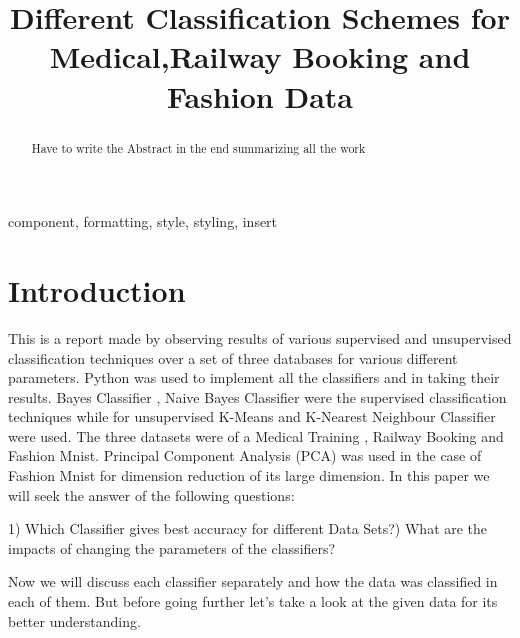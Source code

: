 \documentclass[conference]{IEEEtran}
\begin{document}
\title{Different Classification Schemes for Medical,Railway Booking and Fashion Data\\}

\author{
\and
{}
\and
{}
}

\maketitle

\begin{abstract}
Have to write the Abstract in the end summarizing all the work
\end{abstract}

\begin{IEEEkeywords}
component, formatting, style, styling, insert
\end{IEEEkeywords}

\section{Introduction}
This is a report made by observing results of various supervised and unsupervised classification techniques over a set of three databases for various different parameters. Python was used to implement all the classifiers and in taking their results. Bayes Classifier , Naive Bayes Classifier were the supervised classification techniques while for unsupervised K-Means and K-Nearest Neighbour Classifier were used. The three datasets were of a Medical Training , Railway Booking and Fashion Mnist. Principal Component Analysis (PCA) was used in the case of Fashion Mnist for dimension reduction of its large dimension. In this paper we will seek the answer of the following questions:
\begin{mdframed}
    1) Which Classifier gives best accuracy for different Data Sets?) What are the impacts of changing the parameters of the classifiers?
\end{mdframed}
Now we will discuss each classifier separately and how the data was classified in each of them. But before going further let's take a look at the given data for its better understanding.
\end{document}
